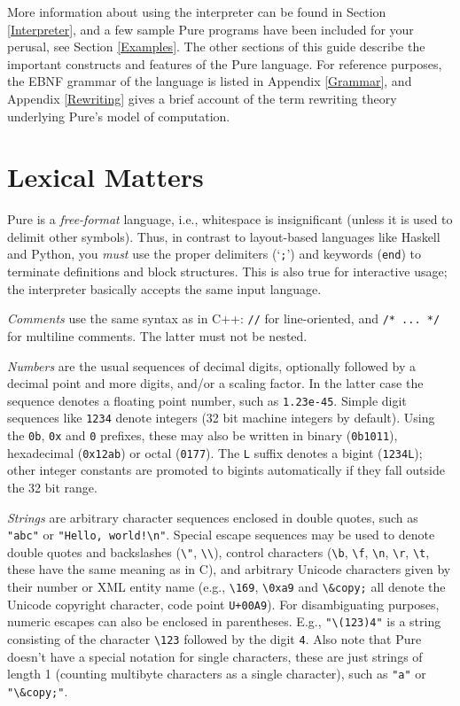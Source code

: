 \documentclass[a4paper,12pt]{article}
\begin{document}
More information about using the interpreter can be found in Section \ref{Interpreter}, and a few sample Pure programs have been included for your perusal, see Section \ref{Examples}. The other sections of this guide describe the important constructs and features of the Pure language. For reference purposes, the EBNF grammar of the language is listed in Appendix \ref{Grammar}, and Appendix \ref{Rewriting} gives a brief account of the term rewriting theory underlying Pure's model of computation.

\section{Lexical Matters}
\label{Lexical}

Pure is a \emph{free-format} language, i.e., whitespace is insignificant (unless it is used to delimit other symbols). Thus, in contrast to layout-based languages like Haskell and Python, you \emph{must} use the proper delimiters (`\verb|;|') and keywords (\lstinline{end}) to terminate definitions and block structures. This is also true for interactive usage; the interpreter basically accepts the same input language.

\emph{Comments} use the same syntax as in C++: \verb|//| for line-oriented, and \verb|/* ... */| for multiline comments. The latter must not be nested.

\emph{Numbers} are the usual sequences of decimal digits, optionally followed by a decimal point and more digits, and/or a scaling factor. In the latter case the sequence denotes a floating point number, such as \verb|1.23e-45|. Simple digit sequences like \verb|1234| denote integers (32 bit machine integers by default). Using the \verb|0b|, \verb|0x| and \verb|0| prefixes, these may also be written in binary (\verb|0b1011|), hexadecimal (\verb|0x12ab|) or octal (\verb|0177|). The \verb|L| suffix denotes a bigint (\verb|1234L|); other integer constants are promoted to bigints automatically if they fall outside the 32 bit range.

\emph{Strings} are arbitrary character sequences enclosed in double quotes, such as \lstinline|"abc"| or \lstinline|"Hello, world!\n"|. Special escape sequences may be used to denote double quotes and backslashes (\verb|\"|, \verb|\\|), control characters (\verb|\b|, \verb|\f|, \verb|\n|, \verb|\r|, \verb|\t|, these have the same meaning as in C), and arbitrary Unicode characters given by their number or XML entity name (e.g., \verb|\169|, \verb|\0xa9| and \verb|\&copy;| all denote the Unicode copyright character, code point \verb|U+00A9|). For disambiguating purposes, numeric escapes can also be enclosed in parentheses. E.g., \verb|"\(123)4"| is a string consisting of the character \verb|\123| followed by the digit \verb|4|. Also note that Pure doesn't have a special notation for single characters, these are just strings of length 1 (counting multibyte characters as a single character), such as \verb|"a"| or \verb|"\&copy;"|.
\end{document}
